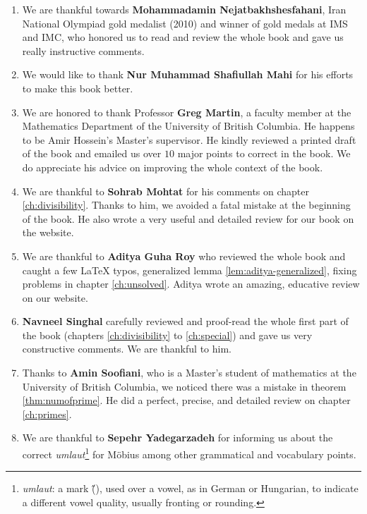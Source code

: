 \documentclass[leqno,12pt]{book}
\begin{document}
\begin{enumerate}
		\item We are thankful towards \textbf{Mohammadamin Nejatbakhshesfahani}, Iran National Olympiad gold medalist (2010) and winner of gold medals at IMS and IMC, who honored us to read and review the whole book and gave us really instructive comments.

		\item We would like to thank \textbf{Nur Muhammad Shafiullah Mahi} for his efforts to make this book better.

		\item We are honored to thank Professor \textbf{Greg Martin}, a faculty member at the Mathematics Department of the University of British Columbia. He happens to be Amir Hossein's Master's supervisor. He kindly reviewed a printed draft of the book and emailed us over $10$ major points to correct in the book. We do appreciate his advice on improving the whole context of the book.

		\item We are thankful to \textbf{Sohrab Mohtat} for his comments on chapter \ref{ch:divisibility}. Thanks to him, we avoided a fatal mistake at the beginning of the book. He also wrote a very useful and detailed review for our book on the website.

		\item We are thankful to \textbf{Aditya Guha Roy} who reviewed the whole book and caught a few LaTeX typos, generalized lemma \eqref{lem:aditya-generalized}, fixing problems in chapter \ref{ch:unsolved}. Aditya wrote an amazing, educative review on our website.
		\item \textbf{Navneel Singhal} carefully reviewed and proof-read the whole first part of the book (chapters \ref{ch:divisibility} to \ref{ch:special}) and gave us very constructive comments. We are thankful to him.

		\item Thanks to \textbf{Amin Soofiani}, who is a Master's student of mathematics at the University of British Columbia, we noticed there was a mistake in theorem \eqref{thm:numofprime}. He did a perfect, precise, and detailed review on chapter \ref{ch:primes}.

		\item We are thankful to \textbf{Sepehr Yadegarzadeh} for informing us about the correct \textit{umlaut}\footnote{\textit{umlaut}: a mark (\H{}), used over a vowel, as in German or Hungarian, to indicate a different vowel quality, usually fronting or rounding.} for M\"{o}bius among other grammatical and vocabulary points.
	\end{enumerate}
\end{document}
